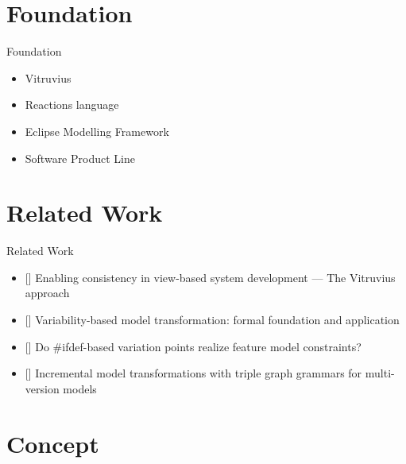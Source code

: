 \documentclass[en]{sdqbeamer}
\begin{document}
\section{Foundation}

\begin{frame}{Foundation}
	\begin{itemize}
		\item Vitruvius 
		\item Reactions language 
		\item Eclipse Modelling Framework 
		\item Software Product Line 
	\end{itemize}
\end{frame}

\section{Related Work}

\begin{frame}{Related Work}
	\begin{itemize}
		\item {}[\cite{KLARE2021110815}] Enabling consistency in view-based system development — The Vitruvius approach 
		\item {}[\cite{struber2018variability}] Variability-based model transformation: formal foundation and application 
		\item {}[\cite{santos2015ifdef}] Do \#ifdef-based variation points realize feature model constraints? 
		\item {}[\cite{barkowsky2023incremental}] Incremental model transformations with triple graph grammars for multi-version models 
	\end{itemize}
\end{frame}

\section{Concept}
\end{document}
